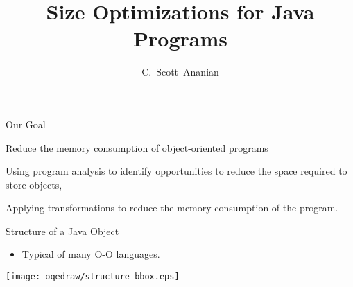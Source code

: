 \documentclass[%
pdf,
colorBG,
slideColor,
nototal,
oqe
]{prosper}
\title{Size Optimizations for Java Programs}
\author{C.~Scott~Ananian}
\begin{document}
\maketitle


\begin{slide}{Our Goal}
\begin{center}
Reduce the memory consumption of object-oriented programs

\vspace{0.5cm}
\vspace{0.5cm}

Using program analysis to identify opportunities to reduce the space
required to store objects,

\vspace{0.5cm}
\vspace{0.5cm}

Applying transformations to reduce the memory consumption of the program.
\end{center}
\end{slide}

\begin{slide}{Structure of a Java Object}
\begin{itemize}
\item Typical of many O-O languages.
\end{itemize}
\begin{center}
\texttt{[image: oqedraw/structure-bbox.eps]}
\end{center}
\end{slide}
\end{document}

